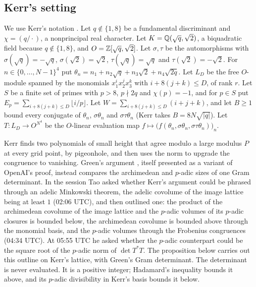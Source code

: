 \subsection*{Kerr's setting}
We use Kerr's notation \cite[\S1, (2)--(8), Lemmas~2--5]{Kerr2026}. Let $q \notin \{1, 8\}$ be a fundamental discriminant and $\chi = (q/\cdot)$, a nonprincipal real character. Let $K = \mathbb{Q}(\sqrt q, \sqrt 2)$, a biquadratic field because $q \notin \{1, 8\}$, and $O = \mathbb{Z}[\sqrt q, \sqrt 2]$. Let $\sigma, \tau$ be the automorphisms with $\sigma(\sqrt q) = -\sqrt q$, $\sigma(\sqrt2) = \sqrt2$, $\tau(\sqrt q) = \sqrt q$ and $\tau(\sqrt2) = -\sqrt2$. For $n \in \{0,\dots,N-1\}^4$ put $\theta_n = n_1 + n_2\sqrt q + n_3\sqrt2 + n_4\sqrt{2q}$. Let $L_D$ be the free $O$-module spanned by the monomials $x_1^i x_2^j x_3^k$ with $i + 8(j+k) \le D$, of rank $r$. Let $S$ be a finite set of primes with $p > 8$, $p \nmid 2q$ and $\chi(p) = -1$, and for $p \in S$ put $E_p = \sum_{i+8(j+k)\le D} \lfloor i/p \rfloor$. Let $W = \sum_{i+8(j+k)\le D} (i+j+k)$, and let $B \ge 1$ bound every conjugate of $\theta_n$, $\sigma\theta_n$ and $\sigma\tau\theta_n$ (Kerr takes $B = 8N\sqrt{|q|}$). Let $T \colon L_D \to O^{N^4}$ be the $O$-linear evaluation map $f \mapsto \big(f(\theta_n, \sigma\theta_n, \sigma\tau\theta_n)\big)_n$.

Kerr finds two polynomials of small height that agree modulo a large modulus $P$ at every grid point, by pigeonhole, and then uses the norm to upgrade the congruence to vanishing. Green's argument \cite[\S\S2, 4, 5]{Green2026v1}, itself presented as a variant of OpenAI's proof, instead compares the archimedean and $p$-adic sizes of one Gram determinant. In the session \cite{OMOSsession2026} Tao asked whether Kerr's argument could be phrased through an adelic Minkowski theorem, the adelic covolume of the image lattice being at least $1$ (02:06 UTC), and then outlined one: the product of the archimedean covolume of the image lattice and the $p$-adic volumes of its $p$-adic closures is bounded below, the archimedean covolume is bounded above through the monomial basis, and the $p$-adic volumes through the Frobenius congruences (04:34 UTC). At 05:55 UTC he asked whether the $p$-adic counterpart could be the square root of the $p$-adic norm of $\det T^*T$. The proposition below carries out this outline on Kerr's lattice, with Green's Gram determinant. The determinant is never evaluated. It is a positive integer; Hadamard's inequality bounds it above, and its $p$-adic divisibility in Kerr's basis bounds it below.

